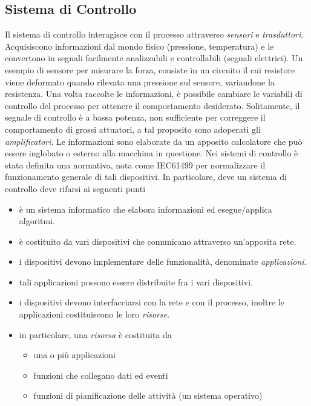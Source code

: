 \documentclass[10pt, letterpaper]{report}
\begin{document}
\subsection{Sistema di Controllo}
Il sistema di controllo interagisce con il processo 
attraverso \textit{sensori} e \textit{trasduttori}. Acquisiscono 
informazioni dal mondo fisico (pressione, temperatura) e le convertono in segnali 
facilmente analizzabili e controllabili (segnali elettrici).
\acc 
Un esempio di sensore per misurare la forza, consiste in un circuito il cui
resistore viene deformato quando rilevata una pressione sul sensore, 
variandone la resistenza.\acc 
Una volta raccolte le informazioni, è possibile cambiare le variabili 
di controllo del processo per ottenere il comportamento desiderato. Solitamente, 
il segnale di controllo è a bassa potenza, non sufficiente per correggere il comportamento 
di grossi attuatori, a tal proposito sono adoperati gli \textit{amplificatori}. Le informazioni 
sono elaborate da un apposito calcolatore che può essere inglobato o 
esterno alla macchina in questione.\acc
Nei sistemi di controllo è stata definita una normativa, nota come 
IEC61499 per normalizzare il funzionamento generale di tali 
dispositivi. In particolare, deve un sistema di controllo deve 
rifarsi ai seguenti punti\begin{itemize}
    \item è un sistema informatico che elabora informazioni ed 
    esegue/applica algoritmi.
    \item è costituito da vari dispositivi che comunicano attraverso un'apposita 
    rete. 
    \item i dispositivi devono implementare delle funzionalità, denominate \textit{applicazioni}.
    \item tali applicazioni possono essere distribuite fra i vari dispositivi. 
    \item i dispositivi devono interfacciarsi con la rete e con il processo, 
    inoltre le applicazioni costituiscono le loro \textit{risorse}.
    \item in particolare, una \textit{risorsa} è costituita da\begin{itemize}
        \item una o più applicazioni 
        \item funzioni che collegano dati ed eventi 
        \item funzioni di pianificazione delle attività (un sistema operativo)
    \end{itemize}
\end{itemize}
\end{document}
